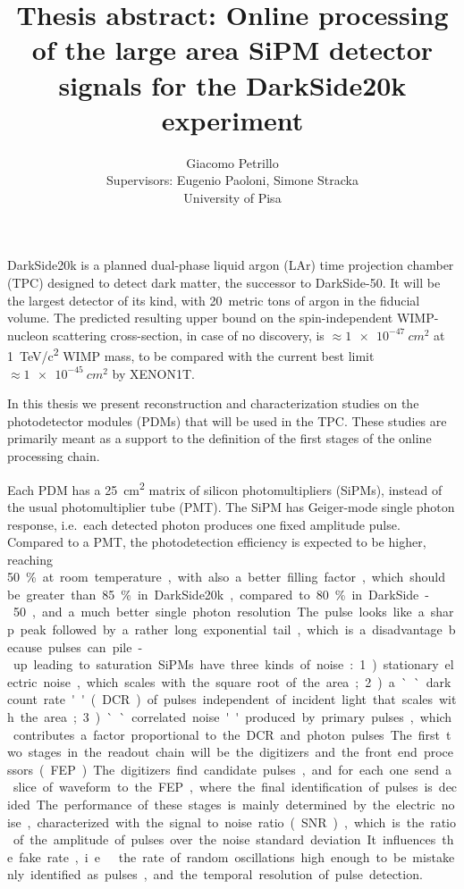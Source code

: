\documentclass[11pt]{article}
\author{Giacomo Petrillo\\
Supervisors: Eugenio Paoloni, Simone Stracka\\
University of Pisa}
\title{Thesis abstract: Online processing of the large area SiPM detector
signals for the DarkSide20k experiment}
\begin{document}
    
    \maketitle

    DarkSide20k is a planned dual-phase liquid argon (LAr) time projection
    chamber (TPC) designed to detect dark matter, the successor to DarkSide-50.
    It will be the largest detector of its kind, with 20~metric tons of argon
    in the fiducial volume. The predicted resulting upper bound on the
    spin-independent WIMP-nucleon scattering cross-section, in case of no
    discovery, is $\approx\SI{1e-47}{cm^2}$ at \SI{1}{TeV/c^2} WIMP mass, to be
    compared with the current best limit $\approx\SI{1e-45}{cm^2}$ by XENON1T.
    
    In this thesis we present reconstruction and characterization studies on
    the photodetector modules (PDMs) that will be used in the TPC. These
    studies are primarily meant as a support to the definition of the first
    stages of the online processing chain.
    
    Each PDM has a \SI{25}{cm^2} matrix of silicon photomultipliers (SiPMs),
    instead of the usual photomultiplier tube (PMT). The SiPM has Geiger-mode
    single photon response, i.e.\ each detected photon produces one fixed
    amplitude pulse. Compared to a PMT, the photodetection efficiency is
    expected to be higher, reaching \SI{50}\% at room temperature, with also a
    better filling factor, which should be greater than \SI{85}\% in
    DarkSide20k, compared to \SI{80}\% in DarkSide-50, and a much better single
    photon resolution. The pulse looks like a sharp peak followed by a rather
    long exponential tail, which is a disadvantage because pulses can pile-up
    leading to saturation.
    
    SiPMs have three kinds of noise: 1) stationary electric noise, which scales
    with the square root of the area; 2) a ``dark count rate'' (DCR) of pulses
    independent of incident light that scales with the area; 3) ``correlated
    noise'' produced by primary pulses, which contributes a factor proportional
    to the DCR and photon pulses.
    
    The first two stages in the readout chain will be the digitizers and the
    front end processors (FEP). The digitizers find candidate pulses, and for
    each one send a slice of waveform to the FEP, where the final
    identification of pulses is decided. The performance of these stages is
    mainly determined by the electric noise, characterized with the signal to
    noise ratio (SNR), which is the ratio of the amplitude of pulses over the
    noise standard deviation. It influences the fake rate, i.e.\ the rate of
    random oscillations high enough to be mistakenly identified as pulses, and
    the temporal resolution of pulse detection.
    
\end{document}
